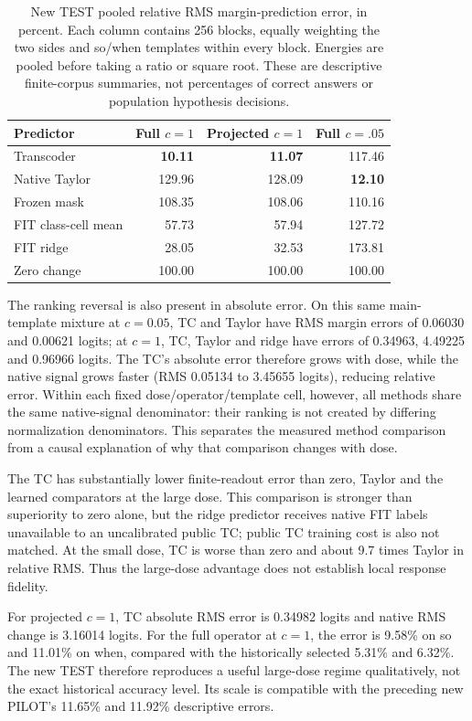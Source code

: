 \begin{table}[ht]
\centering\small
\begin{tabular}{lrrr}
\toprule Predictor & Full $c=1$ & Projected $c=1$ & Full $c=.05$\\
\midrule
Transcoder & \textbf{10.11} & \textbf{11.07} &117.46\\
Native Taylor &129.96&128.09&\textbf{12.10}\\
Frozen mask &108.35&108.06&110.16\\
FIT class-cell mean &57.73&57.94&127.72\\
FIT ridge &28.05&32.53&173.81\\
Zero change &100.00&100.00&100.00\\
\bottomrule
\end{tabular}
\caption{New TEST pooled relative RMS margin-prediction error, in percent. Each column contains 256 blocks, equally weighting the two sides and so/when templates within every block. Energies are pooled before taking a ratio or square root. These are descriptive finite-corpus summaries, not percentages of correct answers or population hypothesis decisions.}\label{tab:newtest}
\end{table}

The ranking reversal is also present in absolute error. On this same main-template mixture at $c=0.05$, TC and Taylor have RMS margin errors of 0.06030 and 0.00621 logits; at $c=1$, TC, Taylor and ridge have errors of 0.34963, 4.49225 and 0.96966 logits. The TC's absolute error therefore grows with dose, while the native signal grows faster (RMS 0.05134 to 3.45655 logits), reducing relative error. Within each fixed dose/operator/template cell, however, all methods share the same native-signal denominator: their ranking is not created by differing normalization denominators. This separates the measured method comparison from a causal explanation of why that comparison changes with dose.


The TC has substantially lower finite-readout error than zero, Taylor and the learned comparators at the large dose. This comparison is stronger than superiority to zero alone, but the ridge predictor receives native FIT labels unavailable to an uncalibrated public TC; public TC training cost is also not matched. At the small dose, TC is worse than zero and about 9.7 times Taylor in relative RMS. Thus the large-dose advantage does not establish local response fidelity.

For projected $c=1$, TC absolute RMS error is 0.34982 logits and native RMS change is 3.16014 logits. For the full operator at $c=1$, the error is 9.58\% on so and 11.01\% on when, compared with the historically selected 5.31\% and 6.32\%. The new TEST therefore reproduces a useful large-dose regime qualitatively, not the exact historical accuracy level. Its scale is compatible with the preceding new PILOT's 11.65\% and 11.92\% descriptive errors.

